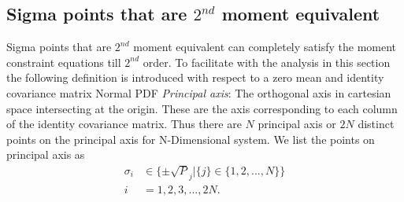 \documentclass[letterpaper, 10 pt, conference]{ieeeconf}  %
\begin{document}
\subsection{Sigma points that are $2^{nd}$ moment equivalent}
Sigma points that are $2^{nd}$ moment equivalent can completely satisfy the moment constraint equations till $2^{nd}$ order. To facilitate with the analysis in this section the following definition is introduced with respect to a zero mean and identity covariance matrix Normal PDF \newline 
\emph{Principal axis}: The orthogonal axis in cartesian space intersecting at the origin. These are the axis corresponding to each column of the identity covariance matrix. Thus there are $N$ principal axis or $2N$ distinct points on the principal axis for N-Dimensional system.  We list the points on principal axis as 
\setlength{\arraycolsep}{0.0em}
\begin{eqnarray}
\sigma_i &\in \{\pm\sqrt{P}_j|\{j\}\in\{1,2,...,N\}\}\\
i&=1,2,3,...,2N. 
\end{eqnarray}
\setlength{\arraycolsep}{5pt} 


\end{document}
